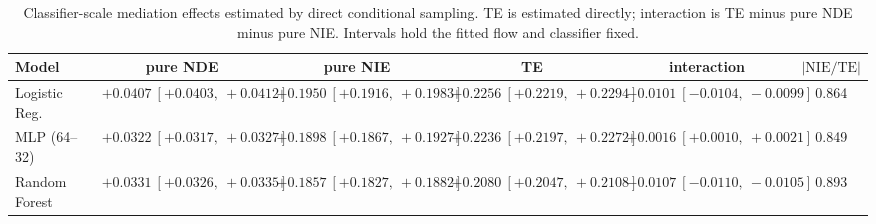 \begin{table}[htbp]
  \centering
  \caption{Classifier-scale mediation effects estimated by direct conditional sampling. TE is estimated directly; interaction is TE minus pure NDE minus pure NIE. Intervals hold the fitted flow and classifier fixed.}
  \label{tab:german_synth_gap_overall}
  \begin{tabular}{lccccc}
    \toprule
    Model & pure NDE & pure NIE & TE & interaction & $|\mathrm{NIE}/\mathrm{TE}|$ \\
    \midrule
    Logistic Reg. & $+0.0407\ [+0.0403,\ +0.0412]$ & $+0.1950\ [+0.1916,\ +0.1983]$ & $+0.2256\ [+0.2219,\ +0.2294]$ & $-0.0101\ [-0.0104,\ -0.0099]$ & 0.864 \\
    MLP (64--32) & $+0.0322\ [+0.0317,\ +0.0327]$ & $+0.1898\ [+0.1867,\ +0.1927]$ & $+0.2236\ [+0.2197,\ +0.2272]$ & $+0.0016\ [+0.0010,\ +0.0021]$ & 0.849 \\
    Random Forest & $+0.0331\ [+0.0326,\ +0.0335]$ & $+0.1857\ [+0.1827,\ +0.1882]$ & $+0.2080\ [+0.2047,\ +0.2108]$ & $-0.0107\ [-0.0110,\ -0.0105]$ & 0.893 \\
    \bottomrule
  \end{tabular}
\end{table}